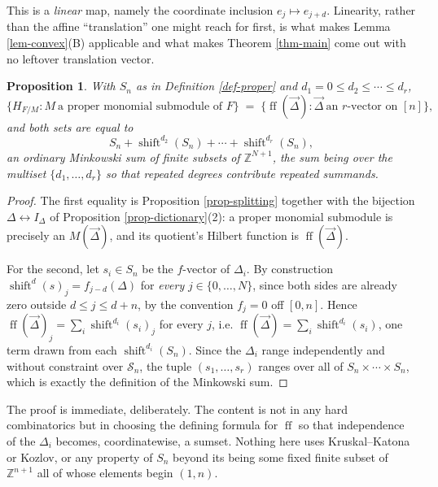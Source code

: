 \documentclass[11pt, a4paper, abstract=yes]{scrartcl}
\theoremstyle{definition}
\theoremstyle{remark}
\theoremstyle{plain}
\newtheorem{proposition}[definition]{Proposition}
\newcommand{\shift}{\operatorname{shift}}
\newcommand{\leanpartial}{\tikz[baseline=-0.6ex]{\fill[leanfull] (0,-0.6ex) arc (-90:90:0.6ex) -- cycle;\draw[leanfull,line width=0.5pt] (0,0) circle (0.6ex);}}
\newcommand{\leanmark}[1]{\leavevmode{\reversemarginpar\marginnote{\raggedleft#1}}}
\newcommand{\ff}{\operatorname{ff}}
\begin{document}
This is a \emph{linear} map, namely the coordinate inclusion \(e_j\mapsto e_{j+d}\). Linearity, rather
than the affine ``translation'' one might reach for first, is what makes Lemma \ref{lem-convex}(B)
applicable and what makes Theorem \ref{thm-main} come out with no leftover translation vector.

\begin{proposition}
\leanmark{\leanpartial}With \(S_n\) as in Definition \ref{def-proper} and \(d_1=0\le d_2\le\cdots\le d_r\),
\begin{equation}\label{eq:sumset}
  \bigl\lbrace H_{F/M}: M\ \text{a proper monomial submodule of }F\bigr\rbrace
  \;=\;\bigl\lbrace\ff(\vec\Delta):\vec\Delta\ \text{an }r\text{-vector on }[n]\bigr\rbrace,
\end{equation}
and both sets are equal to
\begin{equation}\label{eq:sumset-2}
  S_n+\shift^{d_2}(S_n)+\cdots+\shift^{d_r}(S_n),
\end{equation}
an ordinary Minkowski sum of finite subsets of \(\mathbb Z^{N+1}\), the sum being over the \emph{multiset}
\(\lbrace d_1,\dots,d_r\rbrace\) so that repeated degrees contribute repeated summands.
\label{prop:sumset}
\label{prop-sumset}
\end{proposition}

\begin{proof}
The first equality is Proposition \ref{prop-splitting} together with the bijection
\(\Delta\leftrightarrow I_\Delta\) of Proposition \ref{prop-dictionary}(2): a proper monomial submodule is
precisely an \(M(\vec\Delta)\), and its quotient's Hilbert function is \(\ff(\vec\Delta)\).

For the second, let \(s_i\in S_n\) be the \(f\)-vector of \(\Delta_i\). By construction
\(\shift^{d}(s)_j=f_{j-d}(\Delta)\) for \emph{every} \(j\in\lbrace0,\dots,N\rbrace\), since both sides are
already zero outside \(d\le j\le d+n\), by the convention \(f_j=0\) off \([0,n]\). Hence
\(\ff(\vec\Delta)_j=\sum_i\shift^{d_i}(s_i)_j\) for every \(j\), i.e.
\(\ff(\vec\Delta)=\sum_i\shift^{d_i}(s_i)\), one term drawn from each \(\shift^{d_i}(S_n)\). Since
the \(\Delta_i\) range independently and without constraint over \(\mathcal S_n\), the tuple
\((s_1,\dots,s_r)\) ranges over all of \(S_n\times\cdots\times S_n\), which is exactly the definition
of the Minkowski sum.
\end{proof}

The proof is immediate, deliberately. The content is not in any hard combinatorics but in choosing
the defining formula for \(\ff\) so that independence of the \(\Delta_i\) becomes, coordinatewise, a
sumset. Nothing here uses Kruskal--Katona or Kozlov, or any property of \(S_n\) beyond its being some
fixed finite subset of \(\mathbb Z^{n+1}\) all of whose elements begin \((1,n)\).
\end{document}
